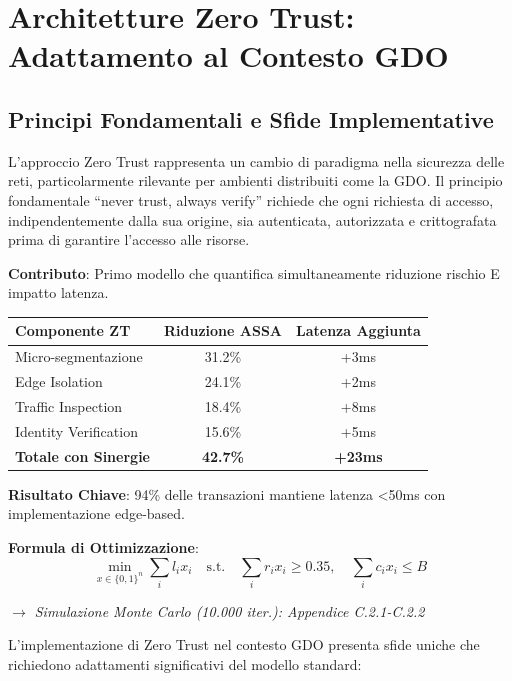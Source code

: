 \section{Architetture Zero Trust: Adattamento al Contesto GDO}

\subsection{Principi Fondamentali e Sfide Implementative}

L'approccio Zero Trust rappresenta un cambio di paradigma nella sicurezza delle reti, particolarmente rilevante per ambienti distribuiti come la GDO. Il principio fondamentale ``never trust, always verify'' richiede che ogni richiesta di accesso, indipendentemente dalla sua origine, sia autenticata, autorizzata e crittografata prima di garantire l'accesso alle risorse.

\begin{tcolorbox}[
    colback=green!5!white,
    colframe=green!65!black,
    title={\textbf{Innovation Box 2.2:} Modello Quantitativo Zero Trust per GDO},
    fonttitle=\bfseries,
    boxrule=1.5pt,
    arc=2mm
]
\textbf{Contributo}: Primo modello che quantifica simultaneamente riduzione rischio E impatto latenza.

\vspace{0.3cm}
\begin{center}
\begin{tabular}{lcc}
\toprule
\textbf{Componente ZT} & \textbf{Riduzione ASSA} & \textbf{Latenza Aggiunta} \\
\midrule
Micro-segmentazione & 31.2\% & +3ms \\
Edge Isolation & 24.1\% & +2ms \\
Traffic Inspection & 18.4\% & +8ms \\
Identity Verification & 15.6\% & +5ms \\
\textbf{Totale con Sinergie} & \textbf{42.7\%} & \textbf{+23ms} \\
\bottomrule
\end{tabular}
\end{center}

\vspace{0.3cm}
\textbf{Risultato Chiave}: 94\% delle transazioni mantiene latenza <50ms con implementazione edge-based.

\vspace{0.3cm}
\textbf{Formula di Ottimizzazione}:
\begin{equation*}
\min_{x \in \{0,1\}^n} \sum_{i} l_i x_i \quad \text{s.t.} \quad \sum_{i} r_i x_i \geq 0.35, \quad \sum_{i} c_i x_i \leq B
\end{equation*}

\textit{$\rightarrow$ Simulazione Monte Carlo (10.000 iter.): Appendice C.2.1-C.2.2}
\end{tcolorbox}
L'implementazione di Zero Trust nel contesto GDO presenta sfide uniche che richiedono adattamenti significativi del modello standard:

